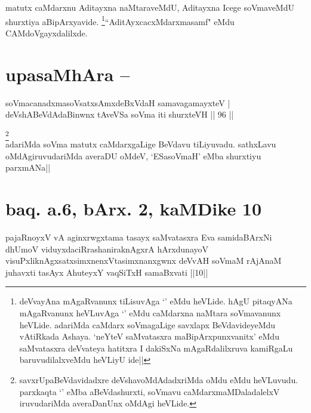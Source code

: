 \begin{artha}
matutx caMdarxnu Aditayxna naMtaraveMdU, Aditayxna Icege soVmaveMdU 
shurxtiya aBipArxyavide. \footnote[1]{deVvayAna mAgaRvanunx tiLisuvAga 
`\stext' eMdu heVLide. hAgU pitaqyANa mAgaRvanunx heVLuvAga `\stext' 
eMdu caMdarxna naMtara soVmavanunx heVLide. adariMda caMdarx 
soVmagaLige savxlapx BeVdavideyeMdu vAtiRkada Ashaya. `neYteV 
saMvatasxra maBipArxpunxvanitx' eMdu saMvatasxra deVvateya hatitxra I 
dakiSxNa mAgaRdalilxruva kamiRgaLu baruvudilalxveMdu heVLiyU ide||}``AditAyxcacxMdarxmasamf" eMdu 
CAMdoVgayxdalilxde.
\end{artha}

\section*{upasaMhAra --}

\begin{shl}
soVmacanadxmasoVsatxsAmxdeBxVdaH samavagamayxteV | \\
deVshABeVdAdaBinwnx tAveVSa soVma iti shurxteVH \hfill|| 96 || 
\end{shl}

\begin{artha}
\footnote[1]{savxrUpaBeVdavidadxre deVshavoMdAdadxriMda oMdu eMdu 
heVLuvudu. parxkaqta `\stext' eMba aBeVdashurxti, soVmavu 
caMdarxmaMDaladalelxV iruvudariMda averaDanUnx oMdAgi heVLide.}\\
adariMda soVma matutx caMdarxgaLige BeVdavu tiLiyuvadu. sathxLavu 
oMdAgiruvudariMda averaDU oMdeV, `ESasoVmaH' eMba shurxtiyu parxmANa||
\end{artha}


\section*{baq. a.6, bArx. 2, kaMDike 10}

\begin{shl}
pajaRnoyxV vA aginxrwgxtama tasayx saMvatasxra Eva samidaBArxNi dhUmoV viduyxdaciRrashaniraknAgxrA hArxdunayoV visuPxliknAgxsatxsimxnenxVtasimxnanxgwnx deVvAH soVmaM rAjAnaM juhavxti tasAyx AhuteyxY vaqSiTxH samaBxvati ||10||
\end{shl}

